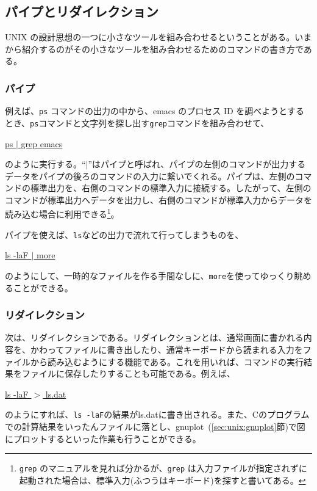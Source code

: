 \subsection{パイプとリダイレクション}

UNIX の設計思想の一つに小さなツールを組み合わせるということがある。いまから紹介するのがその小さなツールを組み合わせるためのコマンドの書き方である。

\subsubsection*{パイプ}
例えば、\texttt{ps} コマンドの出力の中から、emacs のプロセス ID を調べようとするとき、\texttt{ps}コマンドと文字列を探し出す\texttt{grep}コマンドを組み合わせて、
\begin{commandline2}
    \prompt \underline{ps \(|\) grep emacs}
\end{commandline2} \noindent
のように実行する。``\texttt{\(|\)}''はパイプと呼ばれ、パイプの左側のコマンドが出力するデータをパイプの後ろのコマンドの入力に繋いでくれる。パイプは、左側のコマンドの標準出力を、右側のコマンドの標準入力に接続する。したがって、左側のコマンドが標準出力へデータを出力し、右側のコマンドが標準入力からデータを読み込む場合に利用できる\footnote{\texttt{grep} のマニュアルを見れば分かるが、\texttt{grep} は入力ファイルが指定されずに起動された場合は、標準入力(ふつうはキーボード)を探すと書いてある。}。

パイプを使えば、\texttt{ls}などの出力で流れて行ってしまうものを、
\begin{commandline2}
    \prompt \underline{ls -laF \(|\) more}
\end{commandline2} \noindent
のようにして、一時的なファイルを作る手間なしに、\texttt{more}を使ってゆっくり眺めることができる。

\subsubsection*{リダイレクション}
次は、リダイレクションである。リダイレクションとは、通常画面に書かれる内容を、かわってファイルに書き出したり、通常キーボードから読まれる入力をファイルから読み込むようにする機能である。これを用いれば、コマンドの実行結果をファイルに保存したりすることも可能である。例えば、
\begin{commandline2}
    \prompt \underline{ls -laF \(>\) ls.dat}
\end{commandline2} \noindent
のようにすれば、\texttt{ls -laF}の結果がls.datに書き出される。また、Cのプログラムでの計算結果をいったんファイルに落とし、gnuplot~(\ref{sec:unix:gnuplot}節)で図にプロットするといった作業も行うことができる。

